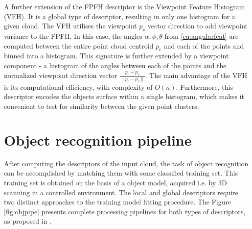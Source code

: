 A further extension of the FPFH descriptor is the Viewpoint Feature Histogram (VFH). It is a global type of descriptor, resulting in only one histogram for a given cloud. The VFH utilises the viewpoint $p_v$ vector direction to add viewpoint variance to the FPFH. In this case, the angles $\alpha, \phi, \theta$ from \ref{eq:angularfeat} are computed between the entire point cloud centroid $p_c$ and each of the points and binned into a histogram. This signature is further extended by a viewpoint component - a histogram of the angles between each of the points and the normalized viewpoint direction vector $\frac{p_c - p_v}{\|p_c - p_v\|}$. The main advantage of the VFH is its computational efficiency, with complexity of $O(n)$. Furthermore, this descriptor encodes the objects surface within a single histogram, which makes it convenient to test for similarity between the given point clusters.





\section{Object recognition pipeline}
\label{sec:pipeline}

After computing the descriptors of the input cloud, the task of object recognition can be accomplished by matching  them with some classified training set. This training set is obtained on the basis of a object model, acquired i.e. by 3D scanning in a controlled environment. The local and global descriptors require two distinct approaches to the training model fitting procedure. The Figure \ref{fig:objpipe} presents complete processing pipelines for both types of descriptors, as proposed in \cite{AldomaMTWPZRGV12}.

